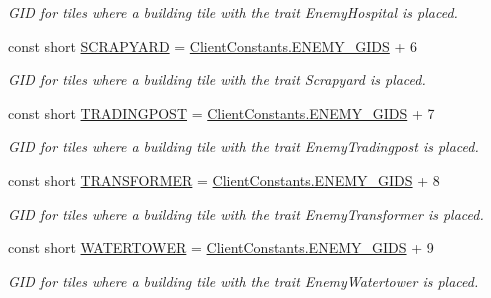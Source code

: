 \begin{DoxyCompactItemize}
\begin{DoxyCompactList}\small\item\em G\+I\+D for tiles where a building tile with the trait Enemy\+Hospital is placed. \end{DoxyCompactList}\item 
const short \hyperlink{classClient_1_1Common_1_1Constants_1_1EnemyBuildingGid_aa87a987b13415a6a9d806405416a6f62}{S\+C\+R\+A\+P\+Y\+A\+R\+D} = \hyperlink{classClient_1_1Common_1_1Constants_1_1ClientConstants_a0f927a203a7e65984b85f98eed560cb7}{Client\+Constants.\+E\+N\+E\+M\+Y\+\_\+\+G\+I\+D\+S} + 6
\begin{DoxyCompactList}\small\item\em G\+I\+D for tiles where a building tile with the trait Scrapyard is placed. \end{DoxyCompactList}\item 
const short \hyperlink{classClient_1_1Common_1_1Constants_1_1EnemyBuildingGid_a3814c240f70a153e7e024ece1ec1b3e2}{T\+R\+A\+D\+I\+N\+G\+P\+O\+S\+T} = \hyperlink{classClient_1_1Common_1_1Constants_1_1ClientConstants_a0f927a203a7e65984b85f98eed560cb7}{Client\+Constants.\+E\+N\+E\+M\+Y\+\_\+\+G\+I\+D\+S} + 7
\begin{DoxyCompactList}\small\item\em G\+I\+D for tiles where a building tile with the trait Enemy\+Tradingpost is placed. \end{DoxyCompactList}\item 
const short \hyperlink{classClient_1_1Common_1_1Constants_1_1EnemyBuildingGid_adb5298582e9b53eaca4578e2da287951}{T\+R\+A\+N\+S\+F\+O\+R\+M\+E\+R} = \hyperlink{classClient_1_1Common_1_1Constants_1_1ClientConstants_a0f927a203a7e65984b85f98eed560cb7}{Client\+Constants.\+E\+N\+E\+M\+Y\+\_\+\+G\+I\+D\+S} + 8
\begin{DoxyCompactList}\small\item\em G\+I\+D for tiles where a building tile with the trait Enemy\+Transformer is placed. \end{DoxyCompactList}\item 
const short \hyperlink{classClient_1_1Common_1_1Constants_1_1EnemyBuildingGid_ac4142a0f5f5a5050245fe8d066989917}{W\+A\+T\+E\+R\+T\+O\+W\+E\+R} = \hyperlink{classClient_1_1Common_1_1Constants_1_1ClientConstants_a0f927a203a7e65984b85f98eed560cb7}{Client\+Constants.\+E\+N\+E\+M\+Y\+\_\+\+G\+I\+D\+S} + 9
\begin{DoxyCompactList}\small\item\em G\+I\+D for tiles where a building tile with the trait Enemy\+Watertower is placed. \end{DoxyCompactList}\item 

\end{DoxyCompactItemize}
